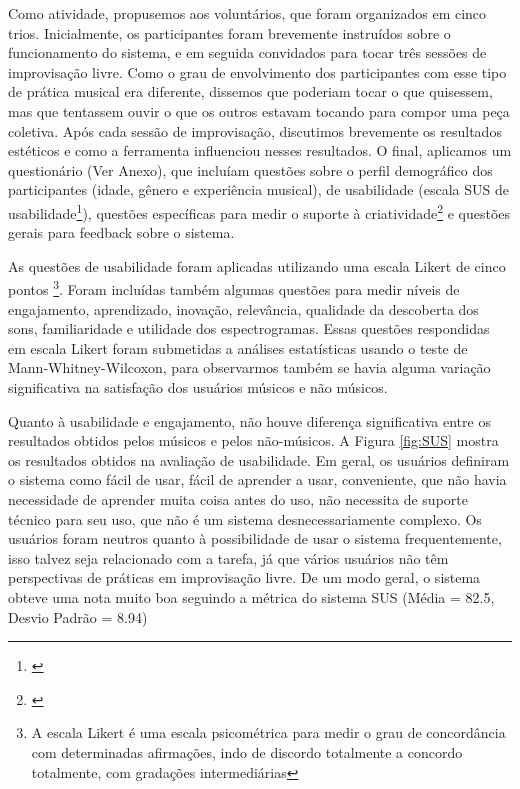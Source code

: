 Como atividade, propusemos aos voluntários, que foram organizados em cinco trios. Inicialmente, os participantes foram brevemente instruídos sobre o funcionamento do sistema, e em seguida convidados para tocar três sessões de improvisação livre. Como o grau de envolvimento dos participantes com esse tipo de prática musical era diferente, dissemos que poderiam tocar o que quisessem, mas que tentassem ouvir o que os outros estavam tocando para compor uma peça coletiva. Após cada sessão de improvisação, discutimos brevemente os resultados estéticos e como a ferramenta influenciou nesses resultados. O final, aplicamos um questionário (Ver Anexo), que incluíam questões sobre o perfil demográfico dos participantes (idade, gênero e experiência musical), de usabilidade (escala SUS de usabilidade\footnote{\cite{Jordan1996}}), questões específicas para medir o suporte à criatividade\footnote{\cite{Cherry2014}} e questões gerais para feedback sobre o sistema. 

As questões de usabilidade foram aplicadas utilizando uma escala Likert de cinco pontos \footnote{A escala Likert é uma escala psicométrica para medir o grau de concordância com determinadas afirmações, indo de discordo totalmente a concordo totalmente, com gradações intermediárias}. Foram incluídas também algumas questões para medir níveis de engajamento, aprendizado, inovação, relevância, qualidade da descoberta dos sons, familiaridade e utilidade dos espectrogramas. Essas questões respondidas em escala Likert foram submetidas a análises estatísticas usando o teste de Mann-Whitney-Wilcoxon, para observarmos também se havia alguma variação significativa na satisfação dos usuários músicos e não músicos.

Quanto à usabilidade e engajamento, não houve diferença significativa entre os resultados obtidos pelos músicos e pelos não-músicos. A Figura \ref{fig:SUS} mostra os resultados obtidos na avaliação de usabilidade. Em geral, os usuários definiram o sistema como fácil de usar, fácil de aprender a usar, conveniente, que não havia necessidade de aprender muita coisa antes do uso, não necessita de suporte técnico para seu uso, que não é um sistema desnecessariamente complexo. Os usuários foram neutros quanto à possibilidade de usar o sistema frequentemente, isso talvez seja relacionado com a tarefa, já que vários usuários não têm perspectivas de práticas em improvisação livre. De um modo geral, o sistema obteve uma nota muito boa seguindo a métrica do sistema SUS (Média = 82.5, Desvio Padrão = 8.94)

